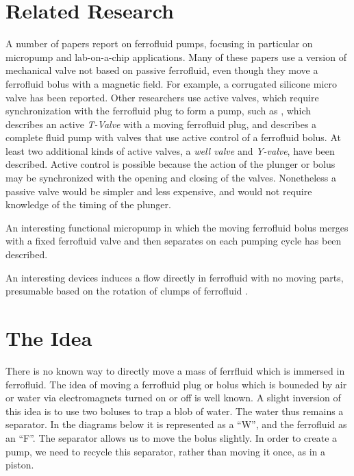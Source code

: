 \documentclass[12pt]{article}
\begin{document}
\section{Related Research}

A number of papers report on ferrofluid pumps, focusing in particular
on micropump and lab-on-a-chip applications\cite{ozbey2015modeling,hsu2018biocompatible}.
Many of these papers use
a version of mechanical valve not based on passive
ferrofluid, even though they move a ferrofluid bolus
with a magnetic field.
For example,
a corrugated silicone micro valve\cite{yamahata2003ferrofluid,yamahata2005plastic}
has been reported.
Other researchers use active valves, which require synchronization with
the ferrofluid plug to form a pump,
such as \cite{menz2000fluidic}, which
describes an active {\em T-Valve} with a moving ferrofluid plug, and
\cite{ando2009ferrofluidic} describes a complete fluid pump with valves
that use
active control of a ferrofluid bolus.
At least two additional kinds of active valves, a {\em well valve} and
{\em Y-valve}, have
been described\cite{hartshorne2004ferrofluid}.
Active control is possible because the
action of the plunger or bolus may be synchronized with the opening and closing
of the valves.
Nonetheless a passive valve would be simpler and less
expensive, and would not require knowledge of the timing of the
plunger.

An interesting functional micropump in which the
moving ferrofluid bolus merges with a fixed ferrofluid valve and then
separates on each pumping cycle has been described\cite{hatch2001ferrofluidic}.

An interesting devices induces a flow directly in ferrofluid
with no moving parts,
presumable based on the rotation of clumps of ferrofluid
\cite{mao2011direct}.

\section{The Idea}

There is no known way to directly move a mass of ferrfluid which is immersed in
ferrofluid.
The idea of moving a ferrofluid plug or bolus which is bouneded by air or water
via electromagnets turned on or off is well known. A slight inversion of this
idea is to use two boluses to trap a blob of water. The water thus remains
a separator. In the diagrams below it is represented as a ``W'',
and the ferrofluid as an ``F''.
The separator allows us to move the bolus slightly.
In order to create a pump, we need to recycle this separator, rather than
moving it once, as in a piston.
\end{document}
